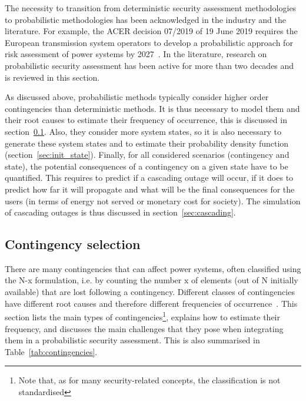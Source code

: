 The necessity to transition from deterministic security assessment methodologies to probabilistic methodologies has been acknowledged in the industry and the literature. For example, the ACER decision 07/2019 of 19 June 2019 requires the European transmission system operators to develop a probabilistic approach for risk assessment of power systems by 2027~\cite{ACER}. In the literature, research on probabilistic security assessment has been active for more than two decades and is reviewed in this section.

As discussed above, probabilistic methods typically consider higher order contingencies than deterministic methods. It is thus necessary to model them and their root causes to estimate their frequency of occurrence, this is discussed in section~\ref{sec:contingencies}. Also, they consider more system states, so it is also necessary to generate these system states and to estimate their probability density function (section~\ref{sec:init_state}). Finally, for all considered scenarios (contingency and state), the potential consequences of a contingency on a given state have to be quantified. This requires to predict if a cascading outage will occur, if it does to predict how far it will propagate and what will be the final consequences for the users (in terms of energy not served or monetary cost for society). The simulation of cascading outages is thus discussed in section~\ref{sec:cascading}.

\subsection{Contingency selection}
\label{sec:contingencies}

There are many contingencies that can affect power systems, often classified using the N-x formulation, i.e. by counting the number x of elements (out of N initially available) that are lost following a contingency. Different classes of contingencies have different root causes and therefore different frequencies of occurrence~\cite{ContingencyTypes}. This section lists the main types of contingencies\footnote{Note that, as for many security-related concepts, the classification is not standardised}, explains how to estimate their frequency, and discusses the main challenges that they pose when integrating them in a probabilistic security assessment. This is also summarised in Table~\ref{tab:contingencies}.


